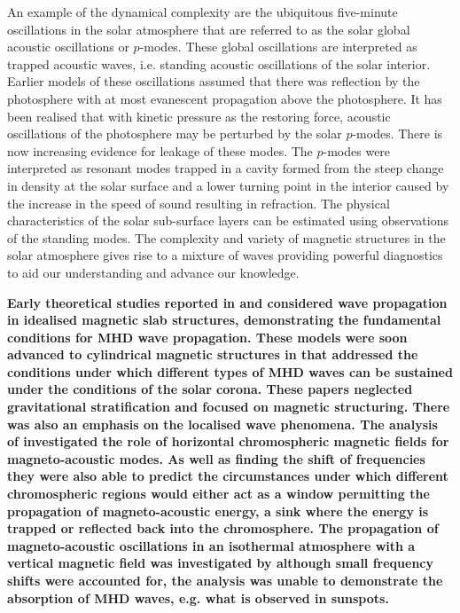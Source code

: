 \documentclass[linenumbers]{aastex63}
\newcommand{\bcr}{\bf\color{red}} %
\begin{document}
An example of the dynamical complexity are the ubiquitous five-minute oscillations in the solar atmosphere that are referred to as the solar global acoustic oscillations or $p$-modes. These global oscillations are interpreted as trapped acoustic waves, i.e. standing acoustic oscillations of the solar interior. Earlier models of these oscillations assumed that there was reflection by the photosphere with at most evanescent propagation above the photosphere. It has been realised that with kinetic pressure as the restoring force, acoustic oscillations of the photosphere may be perturbed by the solar $p$-modes. There is now increasing evidence for leakage of these modes. The $p$-modes were interpreted as resonant modes trapped in a cavity formed from the steep change in density at the solar surface and a lower turning point in the interior caused by the increase in the speed of sound resulting in refraction. The physical characteristics of the solar sub-surface layers can be estimated using observations of the standing modes. The complexity and variety of magnetic structures in the solar atmosphere gives rise to a mixture of waves providing powerful diagnostics to aid our understanding and advance our knowledge.

{\bcr 
Early theoretical studies reported in \citet{Roberts1981a} and \citet{Roberts1981b} considered wave propagation in idealised magnetic slab structures, demonstrating the fundamental conditions for MHD wave propagation. These models were soon advanced to cylindrical magnetic structures in \citet{EdwinandRoberts1983} that addressed the conditions under which different types of MHD waves can be sustained under the conditions of the solar corona. These papers neglected gravitational stratification and focused on magnetic structuring. There was also an emphasis on the localised wave phenomena.  The analysis of \citet{Campbell1989} investigated the role of horizontal chromospheric magnetic fields for magneto-acoustic modes. As well as finding the shift of frequencies they were also able to predict the circumstances under which different chromospheric regions would either act as a window permitting the propagation of magneto-acoustic energy,  a sink where the energy is trapped or reflected back into the chromosphere. The propagation of magneto-acoustic oscillations in an isothermal atmosphere with a vertical magnetic field was investigated by \citet{Hindman1996} although small frequency shifts were accounted for, the analysis was unable to demonstrate the absorption of MHD waves,  e.g. what is observed in sunspots.}  
\end{document}
